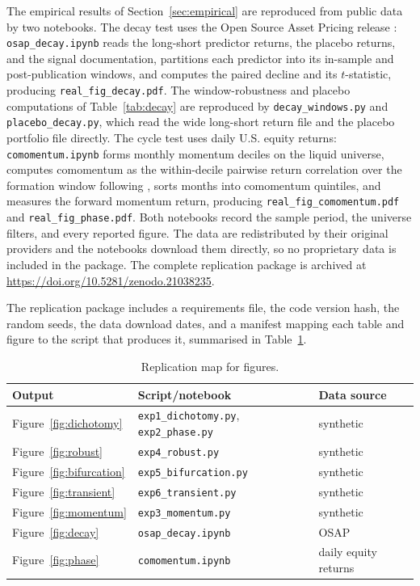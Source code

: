 \documentclass[11pt]{article}
\theoremstyle{plain}
\theoremstyle{definition}
\begin{document}
The empirical results of Section~\ref{sec:empirical} are reproduced from public data by two notebooks. The decay test uses the Open Source Asset Pricing release \citep{chen2020}: \texttt{osap\_decay.ipynb} reads the long-short predictor returns, the placebo returns, and the signal documentation, partitions each predictor into its in-sample and post-publication windows, and computes the paired decline and its $t$-statistic, producing \texttt{real\_fig\_decay.pdf}. The window-robustness and placebo computations of Table~\ref{tab:decay} are reproduced by \texttt{decay\_windows.py} and \texttt{placebo\_decay.py}, which read the wide long-short return file and the placebo portfolio file directly. The cycle test uses daily U.S. equity returns: \texttt{comomentum.ipynb} forms monthly momentum deciles on the liquid universe, computes comomentum as the within-decile pairwise return correlation over the formation window following \citet{lou2022}, sorts months into comomentum quintiles, and measures the forward momentum return, producing \texttt{real\_fig\_comomentum.pdf} and \texttt{real\_fig\_phase.pdf}. Both notebooks record the sample period, the universe filters, and every reported figure. The data are redistributed by their original providers and the notebooks download them directly, so no proprietary data is included in the package. The complete replication package is archived at \url{https://doi.org/10.5281/zenodo.21038235}.

The replication package includes a requirements file, the code version hash, the random seeds, the data download dates, and a manifest mapping each table and figure to the script that produces it, summarised in Table~\ref{tab:repro}.

\begin{table}[h]
\centering
\begin{tabular}{lll}
\toprule
Output & Script/notebook & Data source \\
\midrule
Figure~\ref{fig:dichotomy} & \texttt{exp1\_dichotomy.py}, \texttt{exp2\_phase.py} & synthetic \\
Figure~\ref{fig:robust} & \texttt{exp4\_robust.py} & synthetic \\
Figure~\ref{fig:bifurcation} & \texttt{exp5\_bifurcation.py} & synthetic \\
Figure~\ref{fig:transient} & \texttt{exp6\_transient.py} & synthetic \\
Figure~\ref{fig:momentum} & \texttt{exp3\_momentum.py} & synthetic \\
Figure~\ref{fig:decay} & \texttt{osap\_decay.ipynb} & OSAP \\
Figure~\ref{fig:phase} & \texttt{comomentum.ipynb} & daily equity returns \\
\bottomrule
\end{tabular}
\caption{Replication map for figures.}
\label{tab:repro}
\end{table}
\end{document}

